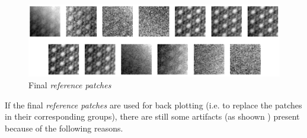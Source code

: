\documentclass[fleqn,10pt]{wlscirep}
\begin{document}
	
	\begin{figure}
		\centering
		\includegraphics[scale=0.8]{./imgs/final_reference_patches.png}
		\caption{Final \textit{reference patches}}
		\label{fig:final_reference_patches}
	\end{figure} 
	
	If the final \textit{reference patches} are used for back plotting (i.e. to replace the patches in their corresponding groups), there are still some artifacts (as shoown ) present because of the following reasons. 
	
	
\end{document}
